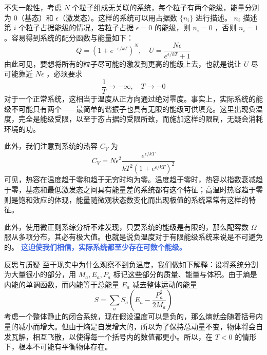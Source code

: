 不失一般性，考虑 $N$ 个粒子组成无关联的系统，每个粒子有两个能级，能量分别为 $0$（基态）和 $\epsilon$（激发态）。这样的系统可以用占据数 $\{n_i\}$ 进行描述。 $n_i $ 描述第 $i$ 个粒子占据能级的情况，若粒子占据 $\epsilon  = 0$ 的能级，则 $n_i = 0$ ，否则 $n_i = 1$ 。容易得到系统的配分函数与能量如下：
\begin{equation}
    Q = (1+ e^{-\epsilon / kT})^N, \quad U = \frac{N\epsilon}{e^{\epsilon / kT} + 1}
\end{equation}
由此可见，要想将所有的粒子尽可能的激发到更高的能级上去，也就是说让 $U$ 尽可能靠近 $N\epsilon$ ，必须要求
\[
    \frac{1}{T} \rightarrow -\infty,\quad T \rightarrow -0
\]
对于一个正常系统，这相当于温度从正方向通过绝对零度。事实上，实际系统的能级不可能只有两个——最简单的谐振子也具有无限的能级可供填充。这里出现负温度，完全是能级受限，以至于态占据的受限所致，而施加这样的限制，无疑会消耗环境的功。

此外，我们注意到系统的热容 $C_V$ 为
\begin{equation}
    C_V = N\epsilon^2\frac{e^{\epsilon / kT}}{kT^2 (1+ e^{\epsilon / kT})^2} 
\end{equation}
可见，热容在温度趋于零和趋于无穷时均为零。温度趋于零时，热容以指数衰减趋于零，基态和最低激发态之间具有能量差的系统都有这个特征；高温时热容趋于零则是饱和效应的体现，能量随微观状态数变化而出现极值的系统常常有这样的特征。

此外，使用微正则系综分析不难发现，只要系统的能级是有限的，那么配容数 $\Omega$ 服从多项分布，其必有极大值。也就是说负温度对于有限能级系统来说是不可避免的。 \textcolor{RoyalBlue}{\textbf{\kaishu 这迫使我们相信，实际系统都至少存在可数个能级。}} 

\begin{justification}{\kaishu 反思与质疑}
\kaishu \fontsize{11pt}{16pt}
\quad\quad 至于现实中为什么观察不到负温度，我们做如下解释：设将系统分割为大量很小的部分，用 $M_a, E_a, P_a$ 标记这些部分的质量、能量与体积。由于熵是内能的单调函数，而内能等于总能量 $E_a$ 减去整体运动的能量
\begin{equation}
    S = \sum_a S_a\left(E_a - \frac{P_a^2}{2M_a} \right)
\end{equation}
考虑一个整体静止的闭合系统，现在假设温度可以是负的，那么熵就会随着括号内量的减小而增大。但由于熵是自发增大的，所以为了保持总动量不变，物体将会自发瓦解，相互飞散，以使得每一个括号内的数值都更小。所以，在 $T < 0$ 的情形下，根本不可能有平衡物体存在。
\end{justification}





